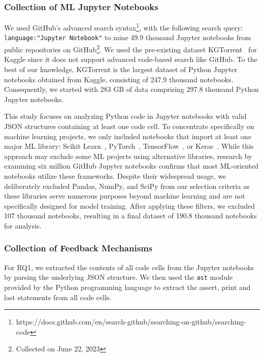 \documentclass[smallextended]{svjour3}       %
\begin{document}
\subsubsection{Collection of ML Jupyter Notebooks}

We used GitHub's advanced search syntax\footnote{https://docs.github.com/en/search-github/searching-on-github/searching-code}, with the following search query: \lstinline[language={}]$language:"Jupyter Notebook"$ to mine 49.9 thousand Jupyter notebooks from public repositories on GitHub\footnote{Collected on June 22, 2023}. We used the pre-existing dataset KGTorrent~\citep{quaranta2021kgtorrent} for Kaggle since it does not support advanced code-based search like GitHub. To the best of our knowledge, KGTorrent is the largest dataset of Python Jupyter notebooks obtained from Kaggle, consisting of 247.9 thousand notebooks. Consequently, we started with 283 GB of data comprising 297.8 thousand Python Jupyter notebooks.

This study focuses on analyzing Python code in Jupyter notebooks with valid JSON structures containing at least one code cell. To concentrate specifically on machine learning projects, we only included notebooks that import at least one major ML library: Scikit Learn~\citep{pedregosa2011scikit-learn}, PyTorch~\citep{paszke2017automatic}, TensorFlow~\citep{abadi2015tensorflow}, or Keras~\citep{chollet2015keras}. While this approach may exclude some ML projects using alternative libraries, research by \citet{psallidas2019data} examining six million GitHub Jupyter notebooks confirms that most ML-oriented notebooks utilize these frameworks. Despite their widespread usage, we deliberately excluded Pandas, NumPy, and SciPy from our selection criteria as these libraries serve numerous purposes beyond machine learning and are not specifically designed for model training. After applying these filters, we excluded 107 thousand notebooks, resulting in a final dataset of 190.8 thousand notebooks for analysis.

\subsubsection{Collection of Feedback Mechanisms}

For RQ1, we extracted the contents of all code cells from the Jupyter notebooks by parsing the underlying JSON structure. We then used the \lstinline{ast} module provided by the Python programming language to extract the assert, print and last statements from all code cells.
\end{document}
